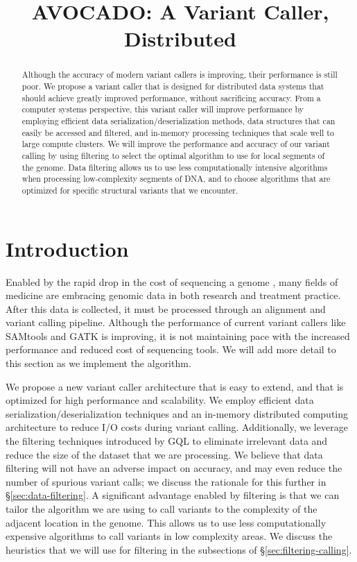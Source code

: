 \documentclass[11pt]{article}
\date{}
\begin{document}
\title{AVOCADO: A Variant Caller, Distributed}
\maketitle

\begin{abstract}
Although the accuracy of modern variant callers is improving, their performance is still poor. We propose
a variant caller that is designed for distributed data systems that should achieve greatly improved performance,
without sacrificing accuracy.
From a computer systems perspective, this variant caller will improve performance by employing efficient data
serialization/deserialization methods, data structures that can easily be accessed and filtered, and in-memory
processing techniques that scale well to large compute clusters. We will improve the performance and accuracy
of our variant calling by using filtering to select the optimal algorithm to use for local segments of the genome.
Data filtering allows us to use less computationally intensive algorithms when processing low-complexity
segments of DNA, and to choose algorithms that are optimized for specific structural variants that we encounter.
\end{abstract}

\section{Introduction}
\label{sec:introduction}

Enabled by the rapid drop in the cost of sequencing a genome \cite{nhgri}, many fields of medicine are embracing genomic
data in both research and treatment practice. After this data is collected, it must be processed through an alignment and
variant calling pipeline. Although the performance of current variant callers like SAMtools \cite{li11} and GATK \cite {mckenna10}
is improving, it is not maintaining pace with the increased performance and reduced cost of sequencing tools. We will add more
detail to this section as we implement the algorithm.

We propose a new variant caller architecture that is easy to extend, and that is optimized for high performance
and scalability. We employ efficient data serialization/deserialization techniques \cite{adam} and an in-memory distributed
computing architecture \cite{zaharia10} to reduce I/O costs during variant calling. Additionally, we leverage the filtering techniques
introduced by GQL \cite{kozanitis13} to eliminate irrelevant data and reduce the size of the dataset that we are processing.
We believe that data filtering will not have an adverse impact on accuracy, and may even reduce the number of spurious
variant calls; we discuss the rationale for this further in \S\ref{sec:data-filtering}. A significant
advantage enabled by filtering is that we can tailor the algorithm we are using to call variants to the complexity of the
adjacent location in the genome. This allows us to use less computationally expensive algorithms to call variants in
low complexity areas. We discuss the heuristics that we will use for filtering in the subsections of \S\ref{sec:filtering-calling}.
\end{document}
